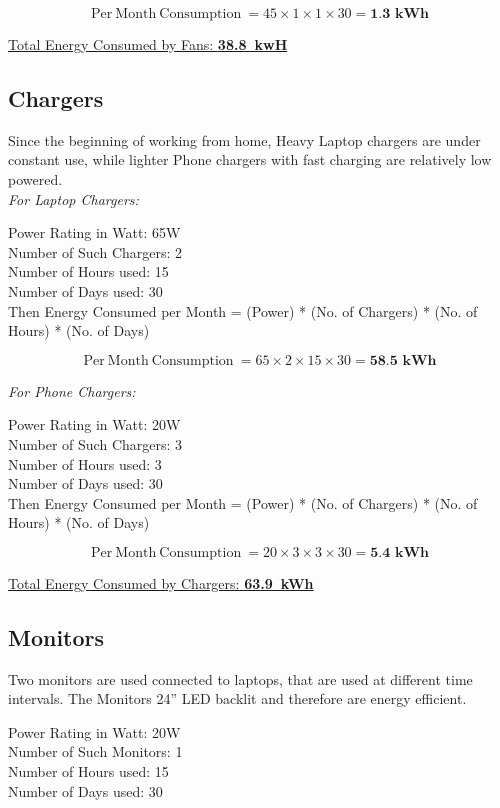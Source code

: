 \documentclass[11pt,a4paper]{article}
\begin{document}
$$
\mathrm{Per\ Month\ Consumption\ } = 45 \times 1 \times 1 \times 30 = \textbf{1.3\ kWh}
$$

\underline{Total Energy Consumed by Fans: \textbf{38.8\ kwH}}


\subsection{Chargers}
Since the beginning of working from home, Heavy Laptop chargers are under constant use, while lighter Phone chargers with fast charging are relatively low powered. \\

\noindent
\textit{For Laptop Chargers:\\}

\noindent
Power Rating in Watt: 65W\\
Number of Such Chargers: 2\\
Number of Hours used: 15\\
Number of Days used: 30\\

Then Energy Consumed per Month = (Power) * (No. of Chargers) * (No. of Hours) * (No. of Days)

$$
\mathrm{Per\ Month\ Consumption\ } = 65 \times 2 \times 15 \times 30 = \textbf{58.5\ kWh}
$$

\noindent
\textit{For Phone Chargers:\\}

\noindent
Power Rating in Watt: 20W\\
Number of Such Chargers: 3\\
Number of Hours used: 3\\
Number of Days used: 30\\

Then Energy Consumed per Month = (Power) * (No. of Chargers) * (No. of Hours) * (No. of Days)

$$
\mathrm{Per\ Month\ Consumption\ } = 20 \times 3 \times 3 \times 30 = \textbf{5.4\ kWh}
$$

\underline{Total Energy Consumed by Chargers: \textbf{63.9\ kWh}}

\subsection{Monitors}
Two monitors are used connected to laptops, that are used at different time intervals. The Monitors 24'' LED backlit and therefore are energy efficient. 

\noindent
Power Rating in Watt: 20W\\
Number of Such Monitors: 1\\
Number of Hours used: 15\\
Number of Days used: 30\\
\end{document}
